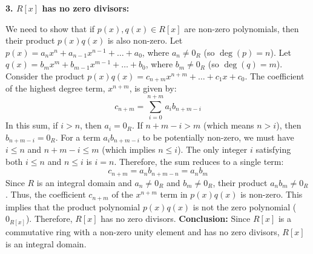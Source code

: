 \documentclass[oneside]{book}
\begin{document}
{	\textbf{3. $R[x]$ has no zero divisors:}

	We need to show that if $p(x), q(x) \in R[x]$ are non-zero polynomials, then their product $p(x)q(x)$ is also non-zero.
	Let $p(x) = a_n x^n + a_{n-1} x^{n-1} + \dots + a_0$, where $a_n \neq 0_R$ (so $\deg(p) = n$).
	Let $q(x) = b_m x^m + b_{m-1} x^{m-1} + \dots + b_0$, where $b_m \neq 0_R$ (so $\deg(q) = m$).
	Consider the product $p(x)q(x) = c_{n+m} x^{n+m} + \dots + c_1 x + c_0$.
	The coefficient of the highest degree term, $x^{n+m}$, is given by:
	$$ c_{n+m} = \sum_{i=0}^{n+m} a_i b_{n+m-i} $$
	In this sum, if $i > n$, then $a_i = 0_R$. If $n+m-i > m$ (which means $n > i$), then $b_{n+m-i} = 0_R$.
	For a term $a_i b_{n+m-i}$ to be potentially non-zero, we must have $i \le n$ and $n+m-i \le m$ (which implies $n \le i$).
	The only integer $i$ satisfying both $i \le n$ and $n \le i$ is $i=n$.
	Therefore, the sum reduces to a single term:
	$$ c_{n+m} = a_n b_{n+m-n} = a_n b_m $$
	Since $R$ is an integral domain and $a_n \neq 0_R$ and $b_m \neq 0_R$, their product $a_n b_m \neq 0_R$.
	Thus, the coefficient $c_{n+m}$ of the $x^{n+m}$ term in $p(x)q(x)$ is non-zero.
	This implies that the product polynomial $p(x)q(x)$ is not the zero polynomial ($0_{R[x]}$).
	Therefore, $R[x]$ has no zero divisors.
	\textbf{Conclusion:}
	Since $R[x]$ is a commutative ring with a non-zero unity element and has no zero divisors, $R[x]$ is an integral domain.
}
\end{document}
